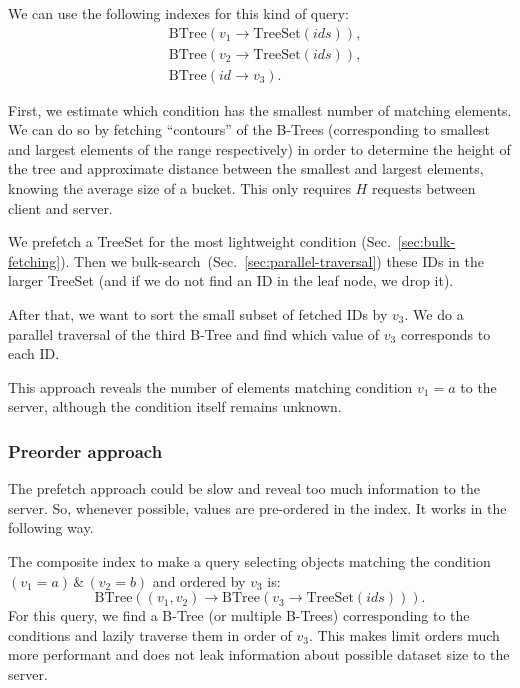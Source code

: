 \documentclass[notitlepage]{revtex4-1}
\begin{document}
We can use the following indexes for this kind of query:
\begin{align*}
    & \mbox{BTree}(v_1 \rightarrow \mbox{TreeSet}(ids)),\\
    & \mbox{BTree}(v_2 \rightarrow \mbox{TreeSet}(ids)),\\
    & \mbox{BTree}(id \rightarrow v_3).
\end{align*}

First, we estimate which condition has the smallest number of matching elements.
We can do so by fetching ``contours'' of the B-Trees (corresponding to smallest and largest elements of the range respectively) in order to determine the height of the tree and approximate distance between the smallest and largest elements, knowing the average size of a bucket. This only requires $H$ requests between client and server.

We prefetch a TreeSet for the most lightweight condition (Sec.~\ref{sec:bulk-fetching}).
Then we bulk-search~(Sec.~\ref{sec:parallel-traversal}) these IDs in the larger TreeSet (and if we do not find an ID in the leaf node, we drop it).

After that, we want to sort the small subset of fetched IDs by $v_3$.
We do a parallel traversal of the third B-Tree and find which value of $v_3$ corresponds to each ID.

This approach reveals the number of elements matching condition $v_1=a$ to the server, although the condition itself remains unknown.

\subsubsection{Preorder approach}

The prefetch approach could be slow and reveal too much information to the server.
So, whenever possible, values are pre-ordered in the index.
It works in the following way.

The composite index to make a query selecting objects matching the condition $(v_1 = a) \,\&\, (v_2 = b)$ and ordered by $v_3$ is:
\begin{equation*}
    \mbox{BTree}((v_1, v_2) \rightarrow \mbox{BTree}(v_3 \rightarrow \mbox{TreeSet}(ids))).
\end{equation*}
For this query, we find a B-Tree (or multiple B-Trees) corresponding to the conditions and lazily traverse them in order of $v_3$.
This makes limit orders much more performant and does not leak information about possible dataset size to the server.
\end{document}

